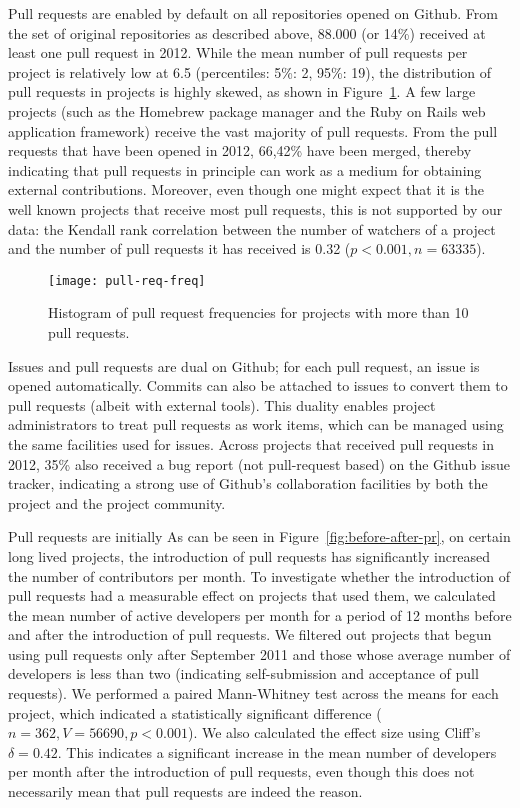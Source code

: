 \documentclass{sig-alternate}
\begin{document}
Pull requests are enabled by default on all repositories opened on Github.  From
the set of original repositories as described above, 88.000 (or 14\%) received
at least one pull request in 2012.  While the mean number of pull requests per
project is relatively low at 6.5 (percentiles: 5\%: 2, 95\%: 19), the
distribution of pull requests in projects is highly skewed, as shown in
Figure~\ref{fig:prfreq}.  A few large projects (such as the Homebrew package
manager and the Ruby on Rails web application framework) receive the vast
majority of pull requests. From the pull requests that have been opened in
2012, 66,42\% have been merged, thereby indicating that pull requests in
principle can work as a medium for obtaining external contributions.  Moreover,
even though one might expect that it is the well known projects that receive
most pull requests, this is not supported by our data: the Kendall rank
correlation between the number of watchers of a project and the number of pull
requests it has received is 0.32 ($p < 0.001, n = 63335$).

\begin{figure}
  \begin{center}
    \texttt{[image: pull-req-freq]}
  \end{center}
  \caption{Histogram of pull request frequencies for projects with more than
  10 pull requests.}
  \label{fig:prfreq}
\end{figure}

Issues and pull requests are dual on Github; for each pull request, an issue is
opened automatically. Commits can also be attached to issues to convert them to
pull requests (albeit with external tools). This duality enables project
administrators to treat pull requests as work items, which can be managed using
the same facilities used for issues. Across projects that received pull
requests in 2012, 35\% also received a bug report (not pull-request based) 
on the Github issue tracker, indicating a strong use of Github's collaboration
facilities by both the project and the project community.

Pull requests are initially 
As can be seen in Figure~\ref{fig:before-after-pr}, on certain
long lived projects, the introduction of pull requests has significantly
increased the number of contributors per month. To investigate whether the
introduction of pull requests had a measurable effect on projects that used
them, we calculated the mean number of active developers per month for a period
of 12 months before and after the introduction of pull requests. We filtered out
projects that begun using pull requests only after September 2011 and those
whose average number of developers is less than two (indicating self-submission
and acceptance of pull requests). We performed a paired Mann-Whitney test
across the means for each project, which indicated a statistically significant
difference ($n = 362, V = 56690, p < 0.001$). We also calculated the effect size
using Cliff's $\delta = 0.42$. This indicates a significant increase in the
mean number of developers per month after the introduction of pull requests,
even though this does not necessarily mean that pull requests are indeed the
reason.
\end{document}

